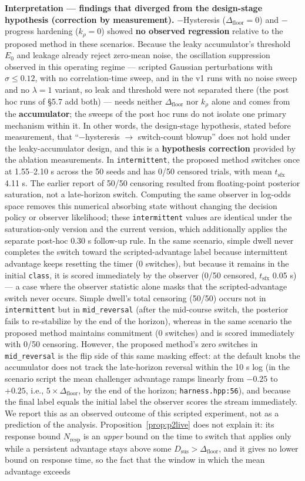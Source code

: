 \documentclass[11pt]{article}
\newcommand{\Class}{\texttt{class}}
\newcommand{\Dfloor}{\Delta_{\text{floor}}}
\newcommand{\code}[1]{\texttt{#1}}
\begin{document}
\textbf{Interpretation --- findings that diverged from the design-stage hypothesis (correction by measurement).} $-$Hysteresis ($\Dfloor = 0$) and $-$progress hardening ($k_\rho = 0$) showed \textbf{no observed regression} relative to the proposed method in these scenarios. Because the leaky accumulator's threshold $E_0$ and leakage already reject zero-mean noise, the oscillation suppression observed in this operating regime --- scripted Gaussian perturbations with $\sigma\le0.12$, with no correlation-time sweep, and in the v1 runs with no noise sweep and no $\lambda=1$ variant, so leak and threshold were not separated there (the post hoc runs of \S5.7 add both) --- needs neither $\Dfloor$ nor $k_\rho$ alone and comes from the \textbf{accumulator}; the sweeps of the post hoc runs do not isolate one primary mechanism within it. In other words, the design-stage hypothesis, stated before measurement, that ``$-$hysteresis $\to$ switch-count blowup'' does not hold under the leaky-accumulator design, and this is a \textbf{hypothesis correction} provided by the ablation measurements. In \code{intermittent}, the proposed method switches once at 1.55--2.10 s across the 50 seeds and has 0/50 censored trials, with mean $t_{\text{sfx}}$ 4.11 s. The earlier report of 50/50 censoring resulted from floating-point posterior saturation, not a late-horizon switch. Computing the same observer in log-odds space removes this numerical absorbing state without changing the decision policy or observer likelihood; these \code{intermittent} values are identical under the saturation-only version and the current version, which additionally applies the separate post-hoc 0.30 s follow-up rule. In the same scenario, simple dwell never completes the switch toward the scripted-advantage label because intermittent advantage keeps resetting the timer (0 switches), but because it remains in the initial \Class, it is scored immediately by the observer (0/50 censored, $t_{\text{sfx}}$ 0.05 s) --- a case where the observer statistic alone masks that the scripted-advantage switch never occurs. Simple dwell's total censoring (50/50) occurs not in \code{intermittent} but in \code{mid\_reversal} (after the mid-course switch, the posterior fails to re-stabilize by the end of the horizon), whereas in the same scenario the proposed method maintains commitment (0 switches) and is scored immediately with 0/50 censoring. However, the proposed method's zero switches in \code{mid\_reversal} is the flip side of this same masking effect: at the default knobs the accumulator does not track the late-horizon reversal within the 10 s log (in the scenario script the mean challenger advantage ramps linearly from $-0.25$ to $+0.25$, i.e., $5\times\Dfloor$, by the end of the horizon; \code{harness.hpp:56}), and because the final label equals the initial label the observer scores the stream immediately. We report this as an observed outcome of this scripted experiment, not as a prediction of the analysis. Proposition~\ref{prop:p2live} does not explain it: its response bound $N_{\text{resp}}$ is an \emph{upper} bound on the time to switch that applies only while a persistent advantage stays above some $D_{\text{sus}}>\Dfloor$, and it gives no lower bound on response time, so the fact that the window in which the mean advantage exceeds 
\end{document}
